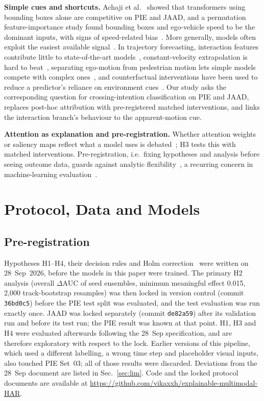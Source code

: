 \documentclass[conference]{IEEEtran}
\newcommand{\dauc}{$\Delta$AUC}
\begin{document}
\textbf{Simple cues and shortcuts.} Achaji et al.~\cite{achaji2022bbox} showed that transformers using bounding boxes alone are competitive on PIE and JAAD, and a permutation feature-importance study found bounding boxes and ego-vehicle speed to be the dominant inputs, with signs of speed-related bias~\cite{featureimportance2024}. More generally, models often exploit the easiest available signal~\cite{geirhos2020shortcut}. In trajectory forecasting, interaction features contribute little to state-of-the-art models~\cite{makansi2022walkalone}, constant-velocity extrapolation is hard to beat~\cite{schoeller2020cvm}, separating ego-motion from pedestrian motion lets simple models compete with complex ones~\cite{neumann2021egomotion}, and counterfactual interventions have been used to reduce a predictor's reliance on environment cues~\cite{chen2021counterfactual}. Our study asks the corresponding question for crossing-intention classification on PIE and JAAD, replaces post-hoc attribution with pre-registered matched interventions, and links the interaction branch's behaviour to the apparent-motion cue.

\textbf{Attention as explanation and pre-registration.} Whether attention weights or saliency maps reflect what a model uses is debated~\cite{jain2019attention,wiegreffe2019attention,adebayo2018sanity}; H3 tests this with matched interventions. Pre-registration, i.e.\ fixing hypotheses and analysis before seeing outcome data, guards against analytic flexibility~\cite{nosek2018prereg}, a recurring concern in machine-learning evaluation~\cite{lipton2019troubling,kapoor2023leakage}.

\section{Protocol, Data and Models}

\subsection{Pre-registration}
Hypotheses H1--H4, their decision rules and Holm correction~\cite{holm1979} were written on 28~Sep~2026, before the models in this paper were trained. The primary H2 analysis (overall \dauc{} of seed ensembles, minimum meaningful effect 0.015, 2{,}000 track-bootstrap resamples) was then locked in version control (commit \texttt{36bd0c5}) before the PIE test split was evaluated, and the test evaluation was run exactly once. JAAD was locked separately (commit \texttt{de82a59}) after its validation run and before its test run; the PIE result was known at that point. H1, H3 and H4 were evaluated afterwards following the 28~Sep specification, and are therefore exploratory with respect to the lock. Earlier versions of this pipeline, which used a different labelling, a wrong time step and placeholder visual inputs, also touched PIE Set~03; all of those results were discarded. Deviations from the 28~Sep document are listed in Sec.~\ref{sec:lim}. Code and the locked protocol documents are available at \url{https://github.com/vikaxxh/explainable-multimodal-HAR}.
\end{document}
